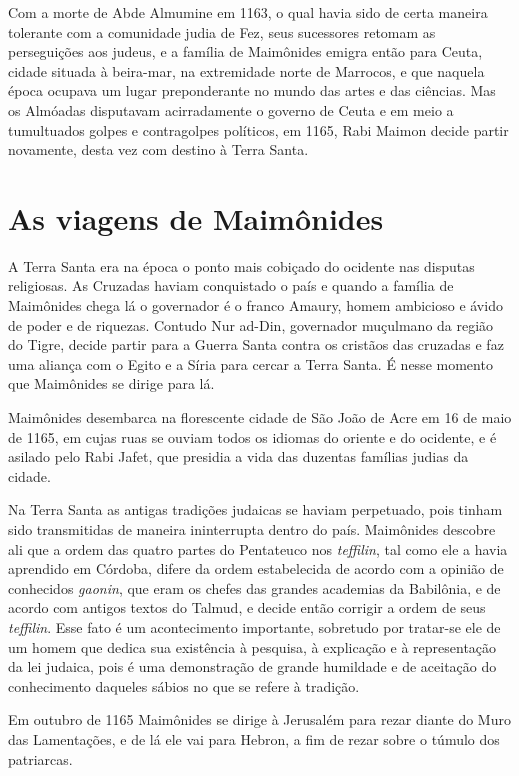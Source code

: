 Com a morte de Abde Almumine em 1163, o qual havia sido de certa maneira
tolerante com a comunidade judia de Fez, seus sucessores retomam as
perseguições aos judeus, e a família de Maimônides emigra então
para Ceuta, cidade situada à beira-mar, na extremidade norte de
Marrocos, e que naquela época ocupava um lugar preponderante no mundo
das artes e das ciências. Mas os Almóadas disputavam acirradamente o
governo de Ceuta e em meio a tumultuados golpes e contragolpes
políticos, em 1165, Rabi Maimon decide partir novamente, desta vez com
destino à Terra Santa.

\section{As viagens de Maimônides}

A Terra Santa era na época o ponto mais cobiçado do ocidente nas
disputas religiosas. As Cruzadas haviam conquistado o país e quando a
família de Maimônides chega lá o governador é o franco Amaury, homem
ambicioso e ávido de poder e de riquezas. Contudo Nur ad-Din, governador
muçulmano da região do Tigre, decide partir para a Guerra Santa contra
os cristãos das cruzadas e faz uma aliança com o Egito e a Síria para
cercar a Terra Santa. É nesse momento que Maimônides se dirige para lá.

Maimônides desembarca na florescente cidade de São João de Acre em 16 de
maio de 1165, em cujas ruas se ouviam todos os idiomas do oriente e do
ocidente, e é asilado pelo Rabi Jafet, que presidia a vida das duzentas
famílias judias da cidade.

Na Terra Santa as antigas tradições judaicas se haviam perpetuado, pois
tinham sido transmitidas de maneira ininterrupta dentro do país. Maimônides 
descobre ali que a ordem das quatro partes do Pentateuco nos
\emph{teffilin}, tal como ele a havia aprendido em Córdoba, difere da ordem
estabelecida de acordo com a opinião de conhecidos \emph{gaonin}, que eram os
chefes das grandes academias da Babilônia, e de acordo com antigos
textos do Talmud, e decide então corrigir a ordem de seus \emph{teffilin}. Esse
fato é um acontecimento importante, sobretudo por tratar-se ele de um
homem que dedica sua existência à pesquisa, à explicação e à
representação da lei judaica, pois é uma demonstração de grande
humildade e de aceitação do conhecimento daqueles sábios no que se
refere à tradição.

Em outubro de 1165 Maimônides se dirige à Jerusalém para rezar diante
do Muro das Lamentações, e de lá ele vai para Hebron, a fim de rezar
sobre o túmulo dos patriarcas.

